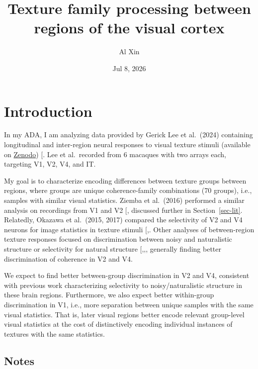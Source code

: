 \documentclass[
  11pt,
  letterpaper,
  DIV=11,
  numbers=noendperiod]{scrartcl}
\title{Texture family processing between regions of the visual cortex}
\author{\small Al Xin}
\date{Jul 8, 2026}
\begin{document}
\maketitle


\section{Introduction}\label{introduction}

In my ADA, I am analyzing data provided by Gerick Lee et al.~(2024)
containing longitudinal and inter-region neural responses to visual
texture stimuli (available on
\href{https://zenodo.org/records/10888270}{Zenodo})
{[}\citeproc{ref-lee_developmentally_2024}{1}{]}. Lee et al.~recorded
from 6 macaques with two arrays each, targeting V1, V2, V4, and IT.

My goal is to characterize encoding differences between texture groups
between regions, where groups are unique coherence-family combinations
(70 groups), i.e., samples with similar visual statistics. Ziemba et
al.~(2016) performed a similar analysis on recordings from V1 and V2
{[}\citeproc{ref-ziemba_selectivity_2016}{2}{]}, discussed further in
Section~\ref{sec-lit}. Relatedly, Okazawa et al.~(2015, 2017) compared
the selectivity of V2 and V4 neurons for image statistics in texture
stimuli
{[},\citeproc{ref-okazawa_gradual_2017}{4}{]}.
Other analyses of between-region texture responses focused on
discrimination between noisy and naturalistic structure or selectivity
for natural structure
{[},,\citeproc{ref-lee_emergence_2025}{6}{]},
generally finding better discrimination of coherence in V2 and V4.

We expect to find better between-group discrimination in V2 and V4,
consistent with previous work characterizing selectivity to
noisy/naturalistic structure in these brain regions. Furthermore, we
also expect better within-group discrimination in V1, i.e., more
separation between unique samples with the same visual statistics. That
is, later visual regions better encode relevant group-level visual
statistics at the cost of distinctively encoding individual instances of
textures with the same statistics.

\subsection{Notes}\label{notes}
\end{document}
